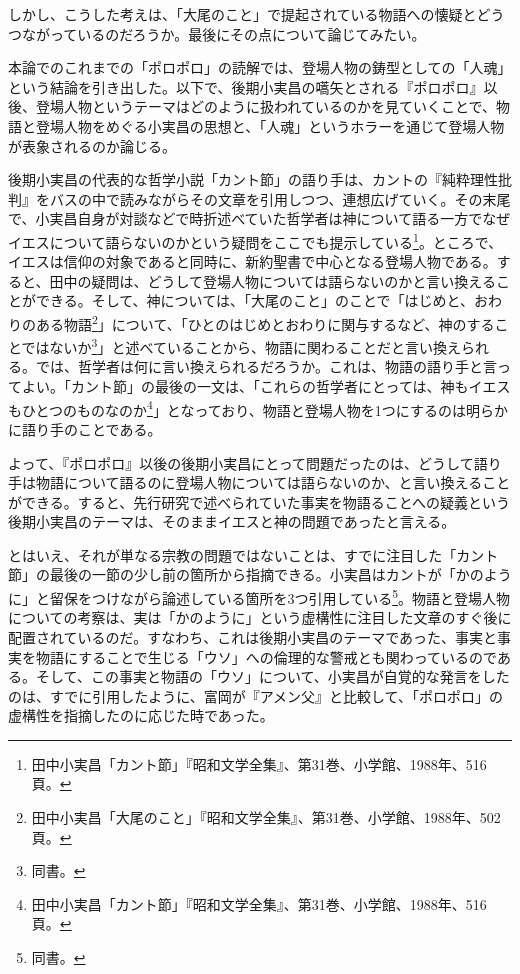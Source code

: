 しかし、こうした考えは、「大尾のこと」で提起されている物語への懐疑とどうつながっているのだろうか。最後にその点について論じてみたい。

本論でのこれまでの「ポロポロ」の読解では、登場人物の鋳型としての「人魂」という結論を引き出した。以下で、後期小実昌の嚆矢とされる『ポロポロ』以後、登場人物というテーマはどのように扱われているのかを見ていくことで、物語と登場人物をめぐる小実昌の思想と、「人魂」というホラーを通じて登場人物が表象されるのか論じる。

後期小実昌の代表的な哲学小説「カント節」の語り手は、カントの『純粋理性批判』をバスの中で読みながらその文章を引用しつつ、連想広げていく。その末尾で、小実昌自身が対談などで時折述べていた哲学者は神について語る一方でなぜイエスについて語らないのかという疑問をここでも提示している\footnote{田中小実昌「カント節」『昭和文学全集』、第31巻、小学館、1988年、516頁。}。ところで、イエスは信仰の対象であると同時に、新約聖書で中心となる登場人物である。すると、田中の疑問は、どうして登場人物については語らないのかと言い換えることができる。そして、神については、「大尾のこと」のことで「はじめと、おわりのある物語\footnote{田中小実昌「大尾のこと」『昭和文学全集』、第31巻、小学館、1988年、502頁。}」について、「ひとのはじめとおわりに関与するなど、神のすることではないか\footnote{同書。}」と述べていることから、物語に関わることだと言い換えられる。では、哲学者は何に言い換えられるだろうか。これは、物語の語り手と言ってよい。「カント節」の最後の一文は、「これらの哲学者にとっては、神もイエスもひとつのものなのか\footnote{田中小実昌「カント節」『昭和文学全集』、第31巻、小学館、1988年、516頁。}」となっており、物語と登場人物を1つにするのは明らかに語り手のことである。

よって、『ポロポロ』以後の後期小実昌にとって問題だったのは、どうして語り手は物語について語るのに登場人物については語らないのか、と言い換えることができる。すると、先行研究で述べられていた事実を物語ることへの疑義という後期小実昌のテーマは、そのままイエスと神の問題であったと言える。

とはいえ、それが単なる宗教の問題ではないことは、すでに注目した「カント節」の最後の一節の少し前の箇所から指摘できる。小実昌はカントが「かのように」と留保をつけながら論述している箇所を3つ引用している\footnote{同書。}。物語と登場人物についての考察は、実は「かのように」という虚構性に注目した文章のすぐ後に配置されているのだ。すなわち、これは後期小実昌のテーマであった、事実と事実を物語にすることで生じる「ウソ」への倫理的な警戒とも関わっているのである。そして、この事実と物語の「ウソ」について、小実昌が自覚的な発言をしたのは、すでに引用したように、富岡が『アメン父』と比較して、「ポロポロ」の虚構性を指摘したのに応じた時であった。

